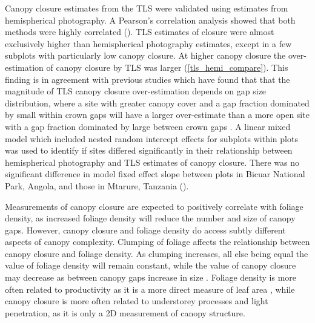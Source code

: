 \documentclass[11pt,a4paper]{article}
\begin{document}
Canopy closure estimates from the TLS were validated using estimates from hemispherical photography. A Pearson's correlation analysis showed that both methods were highly correlated (\hemiCor{}). TLS estimates of closure were almost exclusively higher than hemispherical photography estimates, except in a few subplots with particularly low canopy closure. At higher canopy closure the over-estimation of canopy closure by TLS was larger (\autoref{tls_hemi_compare}). This finding is in agreement with previous studies which have found that that the magnitude of TLS canopy closure over-estimation depends on gap size distribution, where a site with greater canopy cover and a gap fraction dominated by small within crown gaps will have a larger over-estimate than a more open site with a gap fraction dominated by large between crown gaps \citep{Seidel2012}. A linear mixed model which included nested random intercept effects for subplots within plots was used to identify if sites differed significantly in their relationship between hemispherical photography and TLS estimates of canopy closure. There was no significant difference in model fixed effect slope between plots in Bicuar National Park, Angola, and those in Mtarure, Tanzania (\hemiLme{}). 

Measurements of canopy closure are expected to positively correlate with foliage density, as increased foliage density will reduce the number and size of canopy gaps. However, canopy closure and foliage density do access subtly different aspects of canopy complexity. Clumping of foliage affects the relationship between canopy closure and foliage density. As clumping increases, all else being equal the value of foliage density will remain constant, while the value of canopy closure may decrease as between canopy gaps increase in size \citep{Beland2021a}. Foliage density is more often related to productivity as it is a more direct measure of leaf area \citep{Seidel2013}, while canopy closure is more often related to understorey processes and light penetration, as it is only a 2D measurement of canopy structure. 
\end{document}
